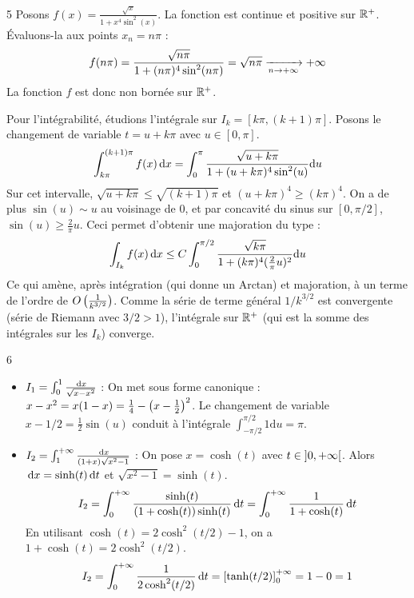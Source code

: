 \begin{correction}{5}
Posons $f(x) = \frac{\sqrt{x}}{1+x^4\sin^2(x)}$.
La fonction est continue et positive sur $\mathbb{R}^+$. Évaluons-la aux points $x_n = n\pi$ :
$$ f(n\pi) = \frac{\sqrt{n\pi}}{1 + (n\pi)^4\sin^2(n\pi)} = \sqrt{n\pi} \xrightarrow[n \to +\infty]{} +\infty $$
La fonction $f$ est donc non bornée sur $\mathbb{R}^+$.

Pour l'intégrabilité, étudions l'intégrale sur $I_k = [k\pi, (k+1)\pi]$. Posons le changement de variable $t = u + k\pi$ avec $u \in [0, \pi]$.
$$ \int_{k\pi}^{(k+1)\pi} f(x)\,\mathrm{d}x = \int_{0}^{\pi} \frac{\sqrt{u+k\pi}}{1 + (u+k\pi)^4\sin^2(u)}\mathrm{d}u $$
Sur cet intervalle, $\sqrt{u+k\pi} \le \sqrt{(k+1)\pi}$ et $(u+k\pi)^4 \ge (k\pi)^4$.
On a de plus $\sin(u) \sim u$ au voisinage de $0$, et par concavité du sinus sur $[0,\pi/2]$, $\sin(u) \ge \frac{2}{\pi}u$. Ceci permet d'obtenir une majoration du type :
$$ \int_{I_k} f(x)\,\mathrm{d}x \le C \int_{0}^{\pi/2} \frac{\sqrt{k\pi}}{1+(k\pi)^4(\frac{2}{\pi}u)^2}\mathrm{d}u $$
Ce qui amène, après intégration (qui donne un Arctan) et majoration, à un terme de l'ordre de $O\left(\frac{1}{k^{3/2}}\right)$.
Comme la série de terme général $1/k^{3/2}$ est convergente (série de Riemann avec $3/2 > 1$), l'intégrale sur $\mathbb{R}^+$ (qui est la somme des intégrales sur les $I_k$) converge.
\end{correction}

\begin{correction}{6}
\begin{itemize}
    \item $I_1 = \int_{0}^{1}\frac{\,\mathrm{d}x}{\sqrt{x-x^{2}}}$ :
    On met sous forme canonique : $x-x^2 = x(1-x) = \frac{1}{4} - \left(x-\frac{1}{2}\right)^2$.
    Le changement de variable $x - 1/2 = \frac{1}{2}\sin(u)$ conduit à l'intégrale $\int_{-\pi/2}^{\pi/2} 1 \mathrm{d}u = \pi$.
    
    \item $I_2 = \int_{1}^{+\infty}\frac{\,\mathrm{d}x}{(1+x)\sqrt{x^{2}-1}}$ :
    On pose $x = \cosh(t)$ avec $t \in \left]0, +\infty\right[$. Alors $\,\mathrm{d}x = \sinh(t)\,\mathrm{d}t$ et $\sqrt{x^2-1} = \sinh(t)$.
    $$ I_2 = \int_{0}^{+\infty} \frac{\sinh(t)}{(1+\cosh(t))\sinh(t)} \,\mathrm{d}t = \int_{0}^{+\infty} \frac{1}{1+\cosh(t)} \,\mathrm{d}t $$
    En utilisant $\cosh(t) = 2\cosh^2(t/2) - 1$, on a $1+\cosh(t) = 2\cosh^2(t/2)$.
    $$ I_2 = \int_{0}^{+\infty} \frac{1}{2\cosh^2(t/2)} \,\mathrm{d}t = \left[ \tanh(t/2) \right]_0^{+\infty} = 1 - 0 = 1 $$
\end{itemize}
\end{correction}


